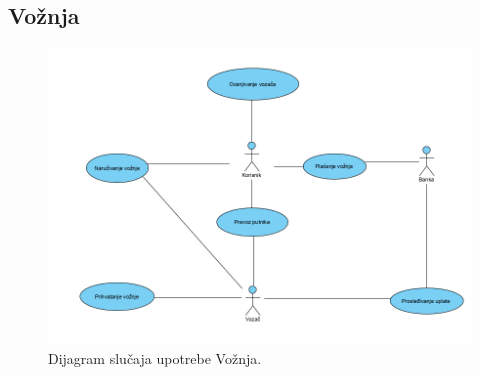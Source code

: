 \subsection{\bfseries Vo\v znja}
\begin{figure}[H]
\begin{center}
\includegraphics[width=\textwidth]{Slike/VoznjaUseCase.png}
\end{center}
    \caption{Dijagram slučaja upotrebe Vožnja.}
\label{fig:Vožnja}
\end{figure}

